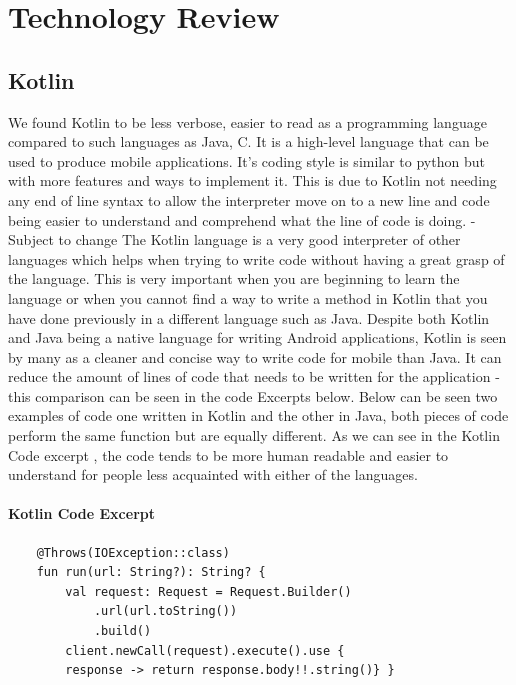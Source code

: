 \chapter{Technology Review}
\section{Kotlin}
We found Kotlin to be less verbose, easier to read as a programming language compared to such languages as Java, C. It is a high-level language that can be used to produce mobile applications. It's coding style is similar to python but with more features and ways to implement it.  \newline
This is due to Kotlin not needing any end of line syntax to allow the interpreter move on to a new line and code being easier to understand and comprehend what the line of code is doing. - Subject to change
\newline \newline
The Kotlin language is a very good interpreter of other languages which helps when trying to write code without having a great grasp of the language. This is very important when you are beginning to learn the language or when you cannot find a way to write a method in Kotlin that you have done previously in a different language such as Java.
\newline \newline
Despite both Kotlin and Java being a native language for writing Android applications, Kotlin is seen by many as a cleaner and concise way to write code for mobile than Java. It can reduce the amount of lines of code that needs to be written for the application - this comparison can be seen in the code Excerpts below.
\newline
\newline
Below can be seen two examples of code one written in Kotlin and the other in Java, both pieces of code perform the same function but are equally different. As we can see in the Kotlin Code excerpt , the code tends to be more human readable and easier to understand for people less acquainted with either of the languages.
\newline

\subsubsection{Kotlin Code Excerpt}
\begin{verbatim}
    @Throws(IOException::class)
    fun run(url: String?): String? {
        val request: Request = Request.Builder()
            .url(url.toString())
            .build()
        client.newCall(request).execute().use {
        response -> return response.body!!.string()} }
\end{verbatim}
